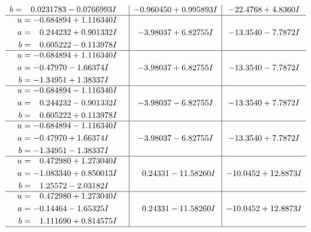 \documentclass[1p]{elsarticle_modified}
\theoremstyle{definition}
\begin{document}
$$\begin{array}{c|c|c}
\begin{aligned}
b &= \phantom{-}0.0231783 - 0.0766993 I\end{aligned}
 & -0.960450 + 0.995893 I & -22.4768 + 4.8360 I \\ \hline\begin{aligned}
u &= -0.684894 + 1.116340 I \\
a &= \phantom{-}0.244232 + 0.901332 I \\
b &= \phantom{-}0.605222 - 0.113978 I\end{aligned}
 & -3.98037 + 6.82755 I & -13.3540 - 7.7872 I \\ \hline\begin{aligned}
u &= -0.684894 + 1.116340 I \\
a &= -0.47970 - 1.66374 I \\
b &= -1.34951 + 1.38337 I\end{aligned}
 & -3.98037 + 6.82755 I & -13.3540 - 7.7872 I \\ \hline\begin{aligned}
u &= -0.684894 - 1.116340 I \\
a &= \phantom{-}0.244232 - 0.901332 I \\
b &= \phantom{-}0.605222 + 0.113978 I\end{aligned}
 & -3.98037 - 6.82755 I & -13.3540 + 7.7872 I \\ \hline\begin{aligned}
u &= -0.684894 - 1.116340 I \\
a &= -0.47970 + 1.66374 I \\
b &= -1.34951 - 1.38337 I\end{aligned}
 & -3.98037 - 6.82755 I & -13.3540 + 7.7872 I \\ \hline\begin{aligned}
u &= \phantom{-}0.472980 + 1.273040 I \\
a &= -1.083340 + 0.850013 I \\
b &= \phantom{-}1.25572 - 2.03182 I\end{aligned}
 & \phantom{-}0.24331 - 11.58260 I & -10.0452 + 12.8873 I \\ \hline\begin{aligned}
u &= \phantom{-}0.472980 + 1.273040 I \\
a &= -0.14464 - 1.65325 I \\
b &= \phantom{-}1.111690 + 0.814575 I\end{aligned}
 & \phantom{-}0.24331 - 11.58260 I & -10.0452 + 12.8873 I\\
 \hline 
 \end{array}$$\newpage$$\begin{array}{c|c|c}  

\end{array}$$
\end{document}
